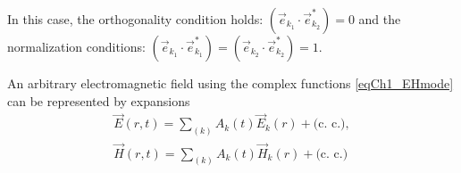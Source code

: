 In this case, the orthogonality condition holds:
$\left(\vec{e}_{k_1} \cdot \vec{e}_{k_2}^{*}\right) = 0$
and the normalization conditions:
$\left(\vec{e}_{k_1} \cdot \vec{e}_{k_1}^{*}\right) = \left(\vec{e}_{k_2}
\cdot \vec{e}_{k_2}^{*}\right) = 1$.

An arbitrary electromagnetic field using the complex functions 
\eqref{eqCh1_EHmode} can be represented by expansions 
\begin{eqnarray}
\vec{E}\left(r, t\right) = 
\sum_{(k)} 
A_k\left(t\right) \vec{E}_k\left(r\right) + \mbox{(c. c.)},
\nonumber \\
\vec{H}\left(r, t\right) = 
\sum_{(k)} 
A_k\left(t\right) \vec{H}_k\left(r\right) +
\mbox{(c. c.)}
\end{eqnarray}